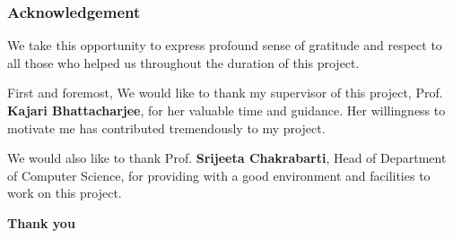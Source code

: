 \documentclass[10pt, aspectratio=169]{beamer}
\begin{document}
	\begin{frame}
		\frametitle{Acknowledgement}

		We take this opportunity to express profound sense of gratitude and respect to
		all those who helped us throughout the duration of this project.

		\vspace{1cm}

		First and foremost, We would like to thank my supervisor of this project, Prof.
		\textbf{Kajari Bhattacharjee}, for her valuable time and guidance. Her
		willingness to motivate me has contributed tremendously to my project.

		\vspace{1cm}

		We would also like to thank Prof. \textbf{Srijeeta Chakrabarti}, Head of
		Department of Computer Science, for providing with a good environment and
		facilities to work on this project.
	\end{frame}

	\begin{frame}
		\centering
		\textbf{\Huge Thank you}
	\end{frame}
\end{document}
